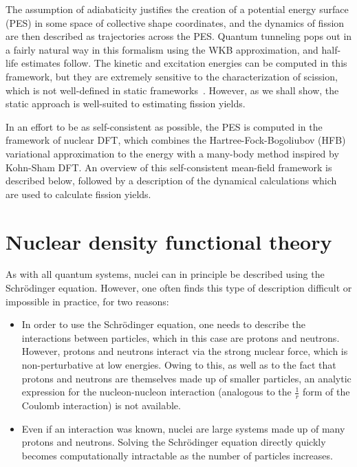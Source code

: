 The assumption of adiabaticity justifies the creation of a potential energy surface (PES) in some space of collective shape coordinates, and the dynamics of fission are then described as trajectories across the PES. Quantum tunneling pops out in a fairly natural way in this formalism using the WKB approximation, and half-life estimates follow. The kinetic and excitation energies can be computed in this framework, but they are extremely sensitive to the characterization of scission, which is not well-defined in static frameworks~\cite{Younes2011}. However, as we shall show, the static approach is well-suited to estimating fission yields.


In an effort to be as self-consistent as possible, the PES is computed in the framework of nuclear DFT, which combines the Hartree-Fock-Bogoliubov (HFB) variational approximation to the energy with a many-body method inspired by Kohn-Sham DFT. An overview of this self-consistent mean-field framework is described below, followed by a description of the dynamical calculations which are used to calculate fission yields.

\section{Nuclear density functional theory}
As with all quantum systems, nuclei can in principle be described using the Schr\"{o}dinger equation. However, one often finds this type of description difficult or impossible in practice, for two reasons:

\begin{itemize}
\item In order to use the Schr\"{o}dinger equation, one needs to describe the interactions between particles, which in this case are protons and neutrons. However, protons and neutrons interact via the strong nuclear force, which is non-perturbative at low energies. Owing to this, as well as to the fact that protons and neutrons are themselves made up of smaller particles, an analytic expression for the nucleon-nucleon interaction (analogous to the $\frac{1}{r}$ form of the Coulomb interaction) is not available.
\item Even if an interaction was known, nuclei are large systems made up of many protons and neutrons. Solving the Schr\"{o}dinger equation directly quickly becomes computationally intractable as the number of particles increases.
\end{itemize}

